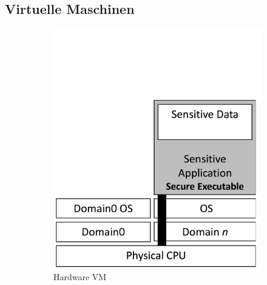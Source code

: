 \documentclass[ngerman]{sig-alternate-05-2015}
\begin{document}
\subsection{Virtuelle Maschinen}
\label{sec:vms}
\begin{figure}
	\centering
	\begin{subfigure}[b]{0.48\columnwidth}
		\includegraphics[width=\columnwidth]{hvm2}
		\caption{Hardware VM}
		\label{fig:hvm}
	\end{subfigure}
	\hfill
	\begin{subfigure}[b]{0.48\columnwidth}

\end{subfigure}
\end{figure}
\end{document}
